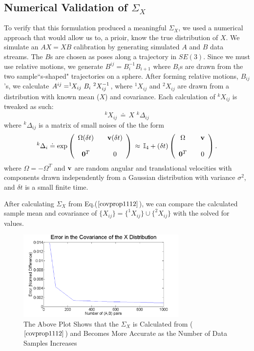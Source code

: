 \documentclass[twocolumn,10pt]{asme2ej}
\begin{document}
\subsection{Numerical Validation of $\Sigma_X$}
To verify that this formulation produced a meaningful $\Sigma_X$, we used a numerical approach that would allow us to, a prioir, know the true distribution of $X$. We simulate an $AX=XB$ calibration by generating simulated $A$ and $B$ data streams. The $B$s are chosen as poses along a trajectory in $SE(3)$. Since we must use relative motions, we generate $B^{ij}=B_i^{-1}B_{i+1}$ where $B_i$s are drawn from the two sample``s-shaped" trajectories on a sphere. After forming relative motions, $B_{ij}$'s, we calculate $A^{ij}= ^1\hspace{-0.05in}X_{ij}\,\,B_i\,\,^2X_{ij}^{-1}$, where $^1X_{ij}$ and $^2X_{ij}$ are drawn from a distribution with known mean ($X$) and covariance. Each calculation of $^kX_{ij}$ is tweaked as such:
\begin{equation} ^kX_{ij} \,\doteq\, X \,\, ^k\Delta_{ij} \label{noisybdef} \end{equation}
where $^k\Delta_{ij}$ is a matrix of small noises of the the form
$$ ^k\Delta_i \doteq
\exp \left(
\begin{array}{ccc}
\Omega (\delta t) & & {\bf v} (\delta t) \\ \\
{\bf 0}^T & & 0 \end{array}
\right) \,
\approx \, \mathbb{I}_4 + (\delta t) \left(
\begin{array}{ccc}
\Omega & & {\bf v} \\ \\
{\bf 0}^T & & 0 \end{array}
\right). $$
where $\Omega = - \Omega^T$ and ${\bf v}$ are random angular and translational velocities with components drawn independently from
a Gaussian distribution with variance $\sigma^2$, and $\delta t$ is a small finite time.

After calculating $\Sigma_X$ from Eq.($\ref{covprop1112}$), we can compare the calculated sample mean and covariance of $\{X_{ij}\}=\{^1X_{ij}\} \cup \{^2X_{ij}\}$ with the solved for values.


\begin{figure}[h]
\begin{center}
\setlength{\unitlength}{0.012500in}%
 \includegraphics[width=3.3in]{figure/sigerror}
\end{center}
\caption{The Above Plot Shows that the $\Sigma_X$ is Calculated from ($\ref{covprop1112}$) and Becomes More Accurate as the Number of Data Samples Increases}
\label{figure_ASME} 
\end{figure}
\end{document}

